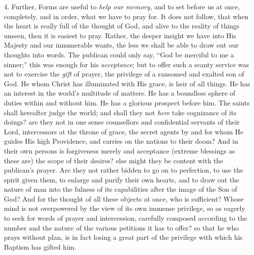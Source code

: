 4. Further, Forms are useful to \emph{help our memory},
and to set before us at once, completely, and in order,
what we have to pray for. It does not follow, that when
the heart is really full of the thought of God, and alive
to the reality of things unseen, then it is easiest to
pray. Rather, the deeper insight we have into His Majesty
and our innumerable wants, the less we shall be able to
draw out our thoughts into words. The publican could only
say, ``God be merciful to me a sinner;'' this was
enough for his \emph{acceptance}; but to offer such a
scanty service was not to exercise the \emph{gift} of
prayer, the privilege of a ransomed and exalted son of
God. He whom Christ has illuminated with His grace, is
heir of all things. He has an interest in the world's
multitude of matters. He has a boundless sphere of duties
within and without him. He has a glorious prospect before
him. The saints shall hereafter judge the world; and
shall they not \emph{here} take cognizance of its doings?
are they not in one sense counsellors and confidential
servants of their Lord, intercessors at the throne of
grace, the secret agents by and for whom He guides His
high Providence, and carries on the nations to their
doom? And in their own persons is forgiveness merely and
acceptance (extreme blessings as these are) the scope of
their desires? else might they be content with the
publican's prayer. Are they not rather bidden to go on to
perfection, to use the spirit given them, to enlarge and
purify their own hearts, and to draw out the nature of
man into the fulness of its capabilities after the image
of the Son of God? And for the thought of all these
objects at once, who is sufficient? Whose mind is not
overpowered by the view of its own immense privilege, so
as eagerly to seek for words of prayer and intercession,
carefully composed according to the number and the nature
of the various petitions it has to offer? so that he who
prays without plan, is in fact losing a great part of the
privilege with which his Baptism has gifted him.

